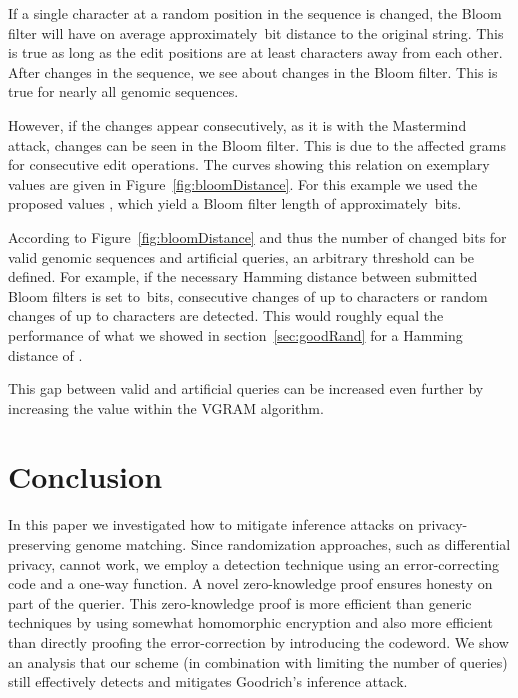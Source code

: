 \documentclass{llncs}
\begin{document}
If a single character at a random position in the sequence is changed, the Bloom filter will have on average approximately \,bit distance to the original string.
This is true as long as the edit positions are at least  characters away from each other.
After  changes in the sequence, we see about  changes in the Bloom filter. This is true for nearly all genomic sequences.

However, if the  changes appear consecutively, as it is with the Mastermind attack,  changes can be seen in the Bloom filter.
This is due to the affected grams for consecutive edit operations. 
The curves showing this relation on exemplary values are given in Figure~\ref{fig:bloomDistance}.
For this example we used the proposed values , which yield a Bloom filter length of approximately \,bits.

According to Figure~\ref{fig:bloomDistance} and thus the number of changed bits for valid genomic sequences and artificial queries, an arbitrary threshold can be defined.
For example, if the necessary Hamming distance between submitted Bloom filters is set to \,bits, consecutive changes of up to  characters or random changes of up to  characters are detected.
This would roughly equal the performance of what we showed in section~\ref{sec:goodRand} for a Hamming distance  of .

This gap between valid and artificial queries can be increased even further by increasing the value  within the VGRAM algorithm.

\section{Conclusion}
\label{sec:conclusion}

In this paper we investigated how to mitigate inference attacks on privacy-preserving genome matching.
Since randomization approaches, such as differential privacy, cannot work, we employ a detection technique using an error-correcting code and a one-way function.
A novel zero-knowledge proof ensures honesty on part of the querier.
This zero-knowledge proof is more efficient than generic techniques by using somewhat homomorphic encryption and also more efficient than directly proofing the error-correction by introducing the codeword.
We show an analysis that our scheme (in combination with limiting the number of queries) still effectively detects and mitigates Goodrich's inference attack.
\end{document}
